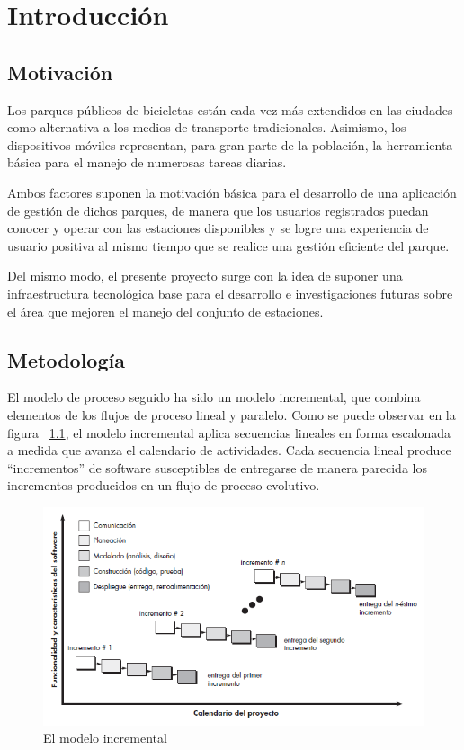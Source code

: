\chapter{Introducción}

\section{Motivación}

Los parques públicos de bicicletas están cada vez más extendidos en las ciudades como alternativa a los medios de transporte tradicionales. Asimismo, los dispositivos móviles representan, para gran parte de la población, la herramienta básica para el manejo de numerosas tareas diarias.

Ambos factores suponen la motivación básica para el desarrollo de una aplicación de gestión de dichos parques, de manera que los usuarios registrados puedan conocer y operar con las estaciones disponibles y se logre una experiencia de usuario positiva al mismo tiempo que se realice una gestión eficiente del parque.

Del mismo modo, el presente proyecto surge con la idea de suponer una infraestructura tecnológica base para el desarrollo e investigaciones futuras sobre el área que mejoren el manejo del conjunto de estaciones.

\section{Metodología}

El modelo de proceso seguido ha sido un modelo incremental, que combina elementos de los flujos de proceso lineal y paralelo. Como se puede observar en la figura ~\ref{fig:procesoIncremental}, el modelo incremental aplica secuencias lineales en forma escalonada a medida que avanza el calendario de actividades. Cada secuencia lineal produce “incrementos” de software susceptibles de entregarse de manera parecida los incrementos producidos en un flujo de proceso evolutivo.

\begin{figure}
	\centering
	\includegraphics[width=\linewidth,height=\textheight,keepaspectratio]{Images/ModeloIncremental}
	\caption{El modelo incremental}
	\label{fig:procesoIncremental}
\end{figure}

